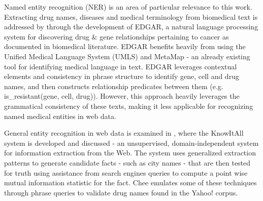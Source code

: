 \documentclass[twoside,11pt]{article}
\begin{document}
Named entity recognition (NER) is an area of particular relevance to this work. Extracting drug names, diseases and medical terminology from biomedical text
is addressed by \citep{Rindflesch} through the development of EDGAR, a natural language processing system for discovering drug & gene relationships pertaining to cancer as documented in biomedical literature. EDGAR benefits heavily from using the Unified Medical Language System (UMLS) and MetaMap \citep{Metamap} - an already existing tool for identifying medical language in text. EDGAR leverages contextual elements and consistency in phrase structure to identify gene, cell and drug names, and then constructs relationship predicates between them (e.g. is\_resistant(gene, cell, drug)). However, this approach heavily leverages the grammatical consistency of these texts, making it less applicable for recognizing named medical entities in web data.

General entity recognition in web data is examined in \citep{Etzioni}, where the KnowItAll system is developed and discussed - an unsupervised, domain-independent system for information extraction from the Web. The system uses generalized extraction patterns to generate candidate facts - such as city names - that are then tested for truth using assistance from search engines queries to compute a point wise mutual information statistic for the fact. Chee emulates some of these techniques through phrase queries to validate drug names found in the Yahoo! corpus.
\end{document}
